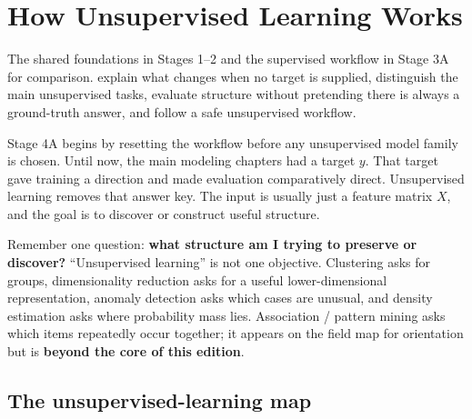 \chapter{How Unsupervised Learning Works}
\label{ch:unsupervised}

\chapterguide%
  {The shared foundations in Stages 1--2 and the supervised workflow in Stage 3A for comparison.}
  {explain what changes when no target is supplied, distinguish the main unsupervised tasks, evaluate structure without pretending there is always a ground-truth answer, and follow a safe unsupervised workflow.}

Stage 4A begins by resetting the workflow before any unsupervised model family is chosen. Until now, the main modeling chapters had a target $y$. That target gave training a direction and made evaluation comparatively direct. Unsupervised learning removes that answer key. The input is usually just a feature matrix $X$, and the goal is to discover or construct useful structure.

\begin{mlfigure}
\end{mlfigure}

\begin{firstread}
Remember one question: \textbf{what structure am I trying to preserve or discover?} ``Unsupervised learning'' is not one objective. Clustering asks for groups, dimensionality reduction asks for a useful lower-dimensional representation, anomaly detection asks which cases are unusual, and density estimation asks where probability mass lies. Association / pattern mining asks which items repeatedly occur together; it appears on the field map for orientation but is \textbf{beyond the core of this edition}.
\end{firstread}

\section{The unsupervised-learning map}


